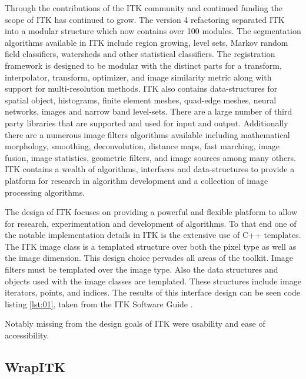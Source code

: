 \documentclass{frontiersMED} %
\begin{document}
Through the contributions of the ITK community and continued funding
the scope of ITK has continued to grow. The version 4 refactoring
separated ITK into a modular structure which now contains over 100
modules. The segmentation algorithms available in ITK include region
growing, level sets, Markov random field classifiers, watersheds and
other statistical classifiers. The registration framework is designed
to be modular with the distinct parts for a transform, interpolator,
transform, optimizer, and image similarity metric along with support
for multi-resolution methods. ITK also contains data-structures for
spatial object, histograms, finite element meshes, quad-edge meshes,
neural networks, images and narrow band level-sets. There are a large
number of third party libraries that are supported and used for input
and output. Additionally there are a numerous image filters algorithms
available including mathematical morphology, smoothing, deconvolution,
distance maps, fast marching, image fusion, image statistics,
geometric filters, and image sources among many others. ITK contains a
wealth of algorithms, interfaces and data-structures to provide a
platform for research in algorithm development and a collection of
image processing algorithms.

The design of ITK focuses on providing a powerful and flexible
platform to allow for research, experimentation and development of
algorithms. To that end one of the notable implementation details in
ITK is the extensive use of C++ templates. The ITK image class is a
templated structure over both the pixel type as well as the image
dimension. This design choice pervades all areas of the toolkit. Image filters
must be templated over the image type. Also the data structures and objects
used with the image classes are templated. These structures
include image iterators, points, and indices. The results of this
interface design can be seen code listing \ref{lst:01}, taken from the
ITK Software Guide \cite{Ibanez2005}.



Notably missing from the design goals of ITK were usability and ease of
accessibility.


\subsection{WrapITK}
\end{document}
